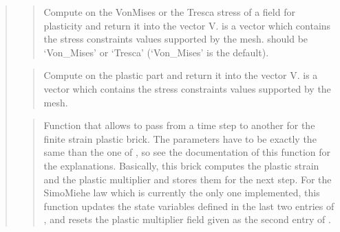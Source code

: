 \documentclass[a4paper,11pt,english]{sphinxmanual}
\begin{document}
\begin{quote}
\sphinxAtStartPar
{}
\begin{quote}

\sphinxAtStartPar
Compute on  the Von\sphinxhyphen{}Mises or the Tresca stress of a field for plasticity and return it into the vector V.
 is a vector which contains the stress constraints values supported by the mesh.
 should be  ‘Von\_Mises’ or ‘Tresca’ (‘Von\_Mises’ is the default).
\end{quote}

\sphinxAtStartPar
{}
\begin{quote}

\sphinxAtStartPar
Compute on  the plastic part and return it into the vector V.
 is a vector which contains the stress constraints values supported by the mesh.
\end{quote}

\sphinxAtStartPar
{}
\begin{quote}

\sphinxAtStartPar
Function that allows to pass from a time step to another for the
finite strain plastic brick. The parameters have to be exactly the
same than the one of ,
so see the documentation of this function for the explanations.
Basically, this brick computes the plastic strain
and the plastic multiplier and stores them for the next step.
For the Simo\sphinxhyphen{}Miehe law which is currently the only one implemented,
this function updates the state variables defined in the last two
entries of , and resets the plastic multiplier field given
as the second entry of .
\end{quote}


\end{quote}
\end{document}
